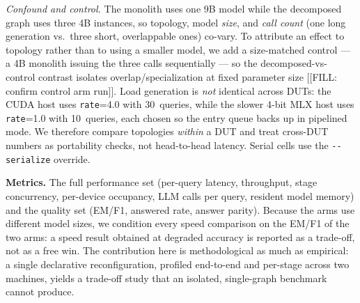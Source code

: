 \emph{Confound and control.} The monolith uses one 9B model while the
decomposed graph uses three 4B instances, so topology, model \emph{size}, and
\emph{call count} (one long generation vs.\ three short, overlappable ones)
co-vary. To attribute an effect to topology rather than to using a smaller
model, we add a size-matched control --- a 4B monolith issuing the three calls
sequentially --- so the decomposed-vs-control contrast isolates
overlap/specialization at fixed parameter size [[FILL: confirm control arm
run]]. Load generation is \emph{not} identical across DUTs: the CUDA host uses
\texttt{rate}=4.0 with 30~queries, while the slower 4-bit MLX host uses
\texttt{rate}=1.0 with 10~queries, each chosen so the entry queue backs up in
pipelined mode. We therefore compare topologies \emph{within} a DUT and treat
cross-DUT numbers as portability checks, not head-to-head latency. Serial cells
use the \texttt{-{}-serialize} override.

\textbf{Metrics.} The full performance set (per-query latency, throughput, stage
concurrency, per-device occupancy, LLM calls per query, resident model memory)
and the quality set (EM/F1, answered rate, answer parity). Because the arms use
different model sizes, we condition every speed comparison on the EM/F1 of the
two arms: a speed result obtained at degraded accuracy is reported as a
trade-off, not as a free win. The contribution here is methodological as much as
empirical: a single declarative reconfiguration, profiled end-to-end and
per-stage across two machines, yields a trade-off study that an isolated,
single-graph benchmark cannot produce.

